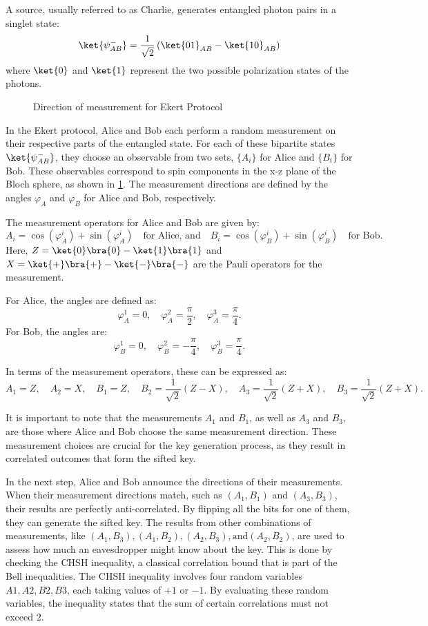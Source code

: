 \documentclass{article}
\begin{document}
A source, usually referred to as Charlie, generates entangled photon pairs in a singlet state:
\[\ket{\psi^{-}_{AB}} = \frac{1}{\sqrt{2}}\left(\ket{01}_{AB}-\ket{10}_{AB}\right)
\]
where $\ket{0}$ and $\ket{1}$ represent the two possible polarization states of the photons.
\begin{figure}[!h]
    
    \caption{Direction of measurement for Ekert Protocol}
    \label{fig:ekertMeasurement}
\end{figure}

In the Ekert protocol, Alice and Bob each perform a random measurement on their respective parts of the entangled state. For each of these bipartite states $\ket{\psi^{-}_{AB}}$, they choose an observable from two sets, $\{A_i\}$ for Alice and $\{B_i\}$ for Bob. These observables correspond to spin components in the x-z plane of the Bloch sphere, as shown in \ref{fig:ekertMeasurement}. The measurement directions are defined by the angles $\varphi_A$ and $\varphi_B$ for Alice and Bob, respectively.

The measurement operators for Alice and Bob are given by:
\[
    A_i = \cos(\varphi_A^i) + \sin(\varphi_A^i) \quad \text{for Alice, and} \quad B_i = \cos(\varphi_B^i) + \sin(\varphi_B^i) \quad \text{for Bob.}
\]
Here, $Z=\ket{0}\bra{0}-\ket{1}\bra{1}$ and $X=\ket{+}\bra{+}-\ket{-}\bra{-}$ are the Pauli operators for the measurement.

For Alice, the angles are defined as:
\[
    \varphi_A^1 = 0, \quad \varphi_A^2 = \frac{\pi}{2}, \quad \varphi_A^3 = \frac{\pi}{4}.
\]
For Bob, the angles are:
\[
    \varphi_B^1 = 0, \quad \varphi_B^2 = -\frac{\pi}{4}, \quad \varphi_B^3 = \frac{\pi}{4}.
\]

In terms of the measurement operators, these can be expressed as:
\[
    A_1 = Z, \quad A_2 = X, \quad B_1 = Z, \quad B_2 = \frac{1}{\sqrt{2}} (Z - X), \quad A_3 = \frac{1}{\sqrt{2}} (Z + X), \quad B_3 = \frac{1}{\sqrt{2}} (Z + X).
\]

It is important to note that the measurements $A_1$ and $B_1$, as well as $A_3$ and $B_3$, are those where Alice and Bob choose the same measurement direction. These measurement choices are crucial for the key generation process, as they result in correlated outcomes that form the sifted key.

In the next step, Alice and Bob announce the directions of their measurements. When their measurement directions match, such as $(A_1 , B_1)$ and $(A_3 , B_3)$, their results are perfectly anti-correlated. By flipping all the bits for one of them, they can generate the sifted key. The results from other combinations of measurements, like $(A_1 , B_3), (A_1 , B_2), (A_2 , B_3), \text{and} (A_2 , B_2)$, are used to assess how much an eavesdropper might know about the key. This is done by checking the CHSH inequality, a classical correlation bound that is part of the Bell inequalities. The CHSH inequality involves four random variables \( A1, A2, B2, B3 \), each taking values of \( +1 \) or \( -1 \). By evaluating these random variables, the inequality states that the sum of certain correlations must not exceed 2.
\end{document}
